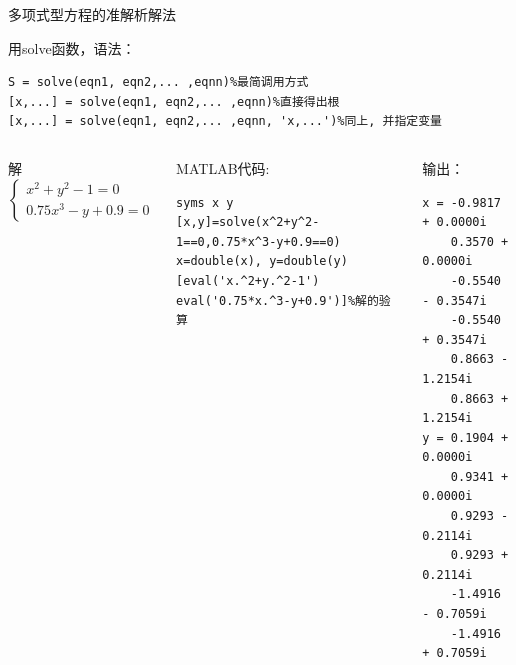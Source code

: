 \documentclass[10pt]{beamer}
\begin{document}
		\begin{frame}[fragile]{多项式型方程的准解析解法}
		\begin{block}{用solve函数，语法：}
\begin{lstlisting}
S = solve(eqn1, eqn2,... ,eqnn)%最简调用方式
[x,...] = solve(eqn1, eqn2,... ,eqnn)%直接得出根
[x,...] = solve(eqn1, eqn2,... ,eqnn, 'x,...')%同上, 并指定变量
\end{lstlisting}
		\end{block}	  
		\begin{columns}[T]
		\begin{example}[6-4]
			解$\left\{\begin{array}{l}
			x^{2}+y^{2}-1=0 \\
			0.75 x^{3}-y+0.9=0
			\end{array}\right.$
		\end{example}
	\begin{block}{MATLAB代码:}
\begin{lstlisting}
syms x y
[x,y]=solve(x^2+y^2-1==0,0.75*x^3-y+0.9==0)
x=double(x), y=double(y)
[eval('x.^2+y.^2-1') eval('0.75*x.^3-y+0.9')]%解的验算
\end{lstlisting}
	\end{block}
		\begin{block}{输出：}
\begin{lstlisting}
x = -0.9817 + 0.0000i
    0.3570 + 0.0000i
    -0.5540 - 0.3547i
    -0.5540 + 0.3547i
    0.8663 - 1.2154i
    0.8663 + 1.2154i
y = 0.1904 + 0.0000i
    0.9341 + 0.0000i
    0.9293 - 0.2114i
    0.9293 + 0.2114i
    -1.4916 - 0.7059i
    -1.4916 + 0.7059i
\end{lstlisting}	
		\end{block}			
	\end{columns}
		\end{frame}
\end{document}
